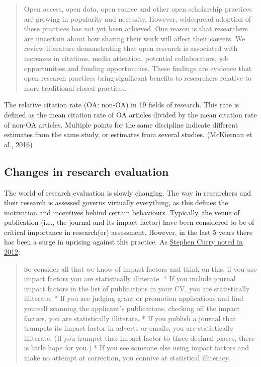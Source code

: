 \documentclass[]{book}
\begin{document}
\begin{quote}
Open access, open data, open source and other open scholarship practices are growing in popularity and necessity. However, widespread adoption of these practices has not yet been achieved. One reason is that researchers are uncertain about how sharing their work will affect their careers. We review literature demonstrating that open research is associated with increases in citations, media attention, potential collaborators, job opportunities and funding opportunities. These findings are evidence that open research practices bring significant benefits to researchers relative to more traditional closed practices.
\end{quote}

The relative citation rate (OA: non-OA) in 19 fields of research. This rate is defined as the mean citation rate of OA articles divided by the mean citation rate of non-OA articles. Multiple points for the same discipline indicate different estimates from the same study, or estimates from several studies. (McKiernan et al., 2016)

\hypertarget{changes-in-research-evaluation}{%
\subsection{Changes in research evaluation }\label{changes-in-research-evaluation}}

The world of research evaluation is slowly changing. The way in researchers and their research is assessed governs virtually everything, as this defines the motivation and incentives behind certain behaviours. Typically, the venue of publication (i.e., the journal and its impact factor) have been considered to be of critical importance in research(er) assessment. However, in the last 5 years there has been a surge in uprising against this practice. As \href{http://occamstypewriter.org/scurry/2012/08/13/sick-of-impact-factors/}{Stephen Curry noted in 2012}:

\begin{quote}
So consider all that we know of impact factors and think on this: if you use impact factors you are statistically illiterate.
* If you include journal impact factors in the list of publications in your CV, you are statistically illiterate.
* If you are judging grant or promotion applications and find yourself scanning the applicant's publications, checking off the impact factors, you are statistically illiterate.
* If you publish a journal that trumpets its impact factor in adverts or emails, you are statistically illiterate. (If you trumpet that impact factor to three decimal places, there is little hope for you.)
* If you see someone else using impact factors and make no attempt at correction, you connive at statistical illiteracy.
\end{quote}
\end{document}
